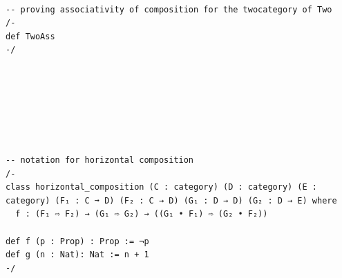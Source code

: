 \documentclass{book}
\newcounter{lcounter}
\newcounter{sectioncount}
\newcounter{subsectioncount}
\renewcommand{\section}[1]{\newpage
\ \\
\ \\
 \begin{center} \scalebox{1.5}{\texttt{\thesectioncount . #1}} \setcounter{sectioncount}{\thesectioncount+1} \setcounter{subsectioncount}{1} \end{center}
 \begin{center}

\ \\
\ \\

\thispagestyle{empty}
\end{center}
}
\begin{document}
\begin{center}
\begin{tcolorbox}[width=5in,colback={white},title={\begin{center}\texttt{Lean \thelcounter} \addtocounter{lcounter}{1}  \end{center}},colbacktitle=Blue,coltitle=black]
\begin{verbatim}

-- proving associativity of composition for the twocategory of Two
/-
def TwoAss
-/

\end{verbatim}%
\end{tcolorbox}
\end{center}


\section{\texttt{•}}

\begin{center}
\begin{tcolorbox}[width=5in,colback={white},title={\begin{center}\texttt{Lean \thelcounter} \addtocounter{lcounter}{1}  \end{center}},colbacktitle=Blue,coltitle=black]
\begin{verbatim}

-- notation for horizontal composition
/-
class horizontal_composition (C : category) (D : category) (E : category) (F₁ : C ➞ D) (F₂ : C → D) (G₁ : D → D) (G₂ : D → E) where
  f : (F₁ ⇨ F₂) → (G₁ ⇨ G₂) → ((G₁ • F₁) ⇨ (G₂ • F₂)) 

def f (p : Prop) : Prop := ¬p
def g (n : Nat): Nat := n + 1
-/

\end{verbatim}%
\end{tcolorbox}
\end{center}
\end{document}
